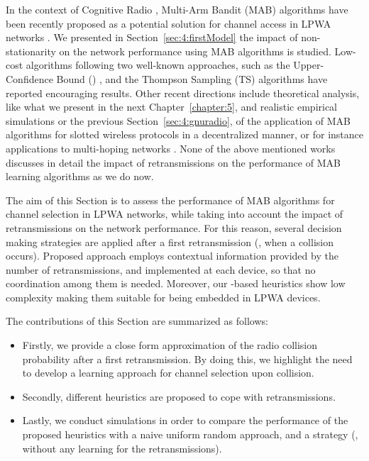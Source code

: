 In the context of Cognitive Radio \cite{Mitola99,Haykin05},
Multi-Arm Bandit (MAB) algorithms \cite{Auer02,Auer02,Bubeck12} have been recently proposed as a potential solution for channel access in LPWA networks \cite{Bonnefoi18,Azari18,Bonnefoi17}.
We presented in Section~\ref{sec:4:firstModel} the impact of non-stationarity on the network performance using MAB algorithms is studied.
Low-cost algorithms following two well-known approaches, such as the Upper-Confidence Bound (\UCB{}) \cite{Auer02,Auer02}, and the Thompson Sampling (TS) algorithms \cite{Thompson33} have reported encouraging results.
Other recent directions include theoretical analysis, like what we present in the next Chapter~\ref{chapter:5},
and realistic empirical simulations \cite{kumar2016two,kumar2017channel} or the previous Section~\ref{sec:4:gnuradio},
of the application of MAB algorithms for slotted wireless protocols in a decentralized manner,
or for instance applications to multi-hoping networks \cite{Mitton16,Toldov16}.
None of the above mentioned works discusses in detail the impact of retransmissions on the performance of MAB learning algorithms as we do now.

The aim of this Section is to assess the performance of MAB algorithms for channel selection in LPWA networks, while taking into account the impact of retransmissions on the network performance.
For this reason, several decision making strategies are applied after a first retransmission (\ie, when a collision occurs).
Proposed approach employs contextual information provided by the number of retransmissions, and implemented at each device, so that no coordination among them is needed.
Moreover, our \UCB{}-based heuristics show low complexity making them suitable for being embedded in LPWA devices.

The contributions of this Section are summarized as follows:
\begin{itemize}
	\item
	Firstly, we provide a close form approximation of the radio collision probability after a first retransmission.
	By doing this, we highlight the need to develop a learning approach for channel selection upon collision.

	\item
	Secondly, different heuristics are proposed to cope with retransmissions.

	\item Lastly, we conduct simulations in order to compare the performance of the proposed heuristics with a naive uniform random approach, and a \UCB{} strategy (\ie, without any learning for the retransmissions).
\end{itemize}


